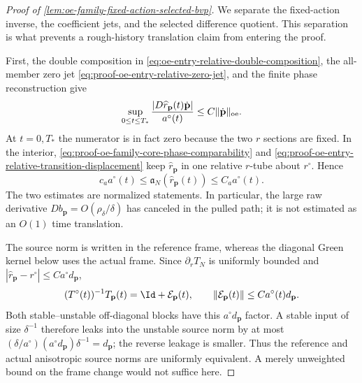 \begin{proof}[Proof of
\cref{lem:oe-family-fixed-action-selected-bvp}]
We separate the fixed-action inverse, the coefficient jets, and the
selected difference quotient.  This separation is what prevents a
rough-history translation claim from entering the proof.

First, the double composition in
\cref{eq:oe-entry-relative-double-composition}, the all-member zero jet
\cref{eq:proof-oe-entry-relative-zero-jet}, and the finite phase
reconstruction give
\begin{equation}
 \sup_{0\le t\le T_*}
 \frac{|D\widehat r_{\mathbf p}(t)
               \dot{\mathbf p}|}{a^\circ(t)}
 \le C\|\dot{\mathbf p}\|_{\rm oe}.             \label{eq:proof-oe-fixed-action-pulled-path-jet}
\end{equation}
At \(t=0,T_*\) the numerator is in fact zero because the two \(r\)
sections are fixed.  In the interior,
\cref{eq:proof-oe-family-core-phase-comparability} and
\cref{eq:proof-oe-entry-relative-transition-displacement} keep
\(\widehat r_{\mathbf p}\) in one relative \(r\)-tube about
\(r^\circ\).  Hence
\begin{equation}
 c_a a^\circ(t)
 \le\mathfrak a_N(\widehat r_{\mathbf p}(t))
 \le C_a a^\circ(t).                           \label{eq:proof-oe-fixed-action-path-comparison}
\end{equation}
The two estimates are normalized statements.  In particular, the large
raw derivative \(Db_{\mathbf p}=O(\rho_\delta/\delta)\) has canceled in
the pulled path; it is not estimated as an \(O(1)\) time translation.

The source norm is written in the reference frame, whereas the diagonal
Green kernel below uses the actual frame.  Since
\(\partial_rT_N\) is uniformly bounded and
\(|\widehat r_{\mathbf p}-r^\circ|
\le Ca^\circ d_{\mathbf p}\),
\begin{equation}
 (T^\circ(t))^{-1}T_{\mathbf p}(t)
 =\Id+\mathcal E_{\mathbf p}(t),\qquad
 \|\mathcal E_{\mathbf p}(t)\|
 \le Ca^\circ(t)d_{\mathbf p}.                 \label{eq:proof-oe-fixed-action-frame-change}
\end{equation}
Both stable--unstable off-diagonal blocks have this
\(a^\circ d_{\mathbf p}\) factor.  A stable input of size
\(\delta^{-1}\) therefore leaks into the unstable source norm by at most
\((\delta/a^\circ)(a^\circ d_{\mathbf p})\delta^{-1}
=d_{\mathbf p}\); the reverse leakage is smaller.  Thus the reference
and actual anisotropic source norms are uniformly equivalent.  A merely
unweighted bound on the frame change would not suffice here.


\end{proof}
